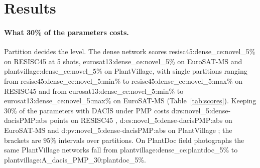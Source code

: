 \section{Results}
\label{sec:results}

\begin{table}[t]
  \centering\small\setlength{\tabcolsep}{4pt}
  
  \caption{Eight channel scores at $30\%$ of the parameters, 5-shot accuracy (\%) on novel classes. P prunes once and recovers; PMP is the prune, meta-train, prune schedule of Fig.~\ref{fig:overview}. Cells are the mean over \num{resisc45:seeds} class partitions with the standard deviation over partitions as subscript. PlantDoc columns test the PlantVillage-trained networks on field photographs.}
  \label{tab:scores}
\end{table}

\paragraph{What 30\% of the parameters costs.}
Partition decides the level. The dense network scores \num{resisc45:dense_ce:novel_5}\% on RESISC45 at 5 shots, \num{eurosat13:dense_ce:novel_5}\% on EuroSAT-MS and \num{plantvillage:dense_ce:novel_5}\% on PlantVillage, with single partitions ranging from \num{resisc45:dense_ce:novel_5:min}\% to \num{resisc45:dense_ce:novel_5:max}\% on RESISC45 and from \num{eurosat13:dense_ce:novel_5:min}\% to \num{eurosat13:dense_ce:novel_5:max}\% on EuroSAT-MS (Table~\ref{tab:scores}). Keeping $30\%$ of the parameters with DACIS under PMP costs \num{d:rs:novel_5:dense-dacisPMP:abs} points on RESISC45 , \num{d:es:novel_5:dense-dacisPMP:abs} on EuroSAT-MS  and \num{d:pv:novel_5:dense-dacisPMP:abs} on PlantVillage ; the brackets are $95\%$ intervals over partitions. On PlantDoc field photographs the same PlantVillage networks fall from \num{plantvillage:dense_ce:plantdoc_5}\% to \num{plantvillage:A_dacis_PMP_30:plantdoc_5}\%.

